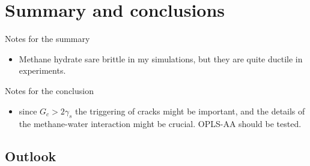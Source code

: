\chapter{Summary and conclusions}

Notes for the summary
\begin{itemize}
\item Methane hydrate sare brittle in my simulations, but they are quite ductile in experiments.
\end{itemize}

Notes for the conclusion
\begin{itemize}
\item since $G_c > 2\gamma_s$ the triggering of cracks might be important, and the details of the methane-water interaction might be crucial. OPLS-AA should be tested.
\end{itemize}


\section{Outlook}